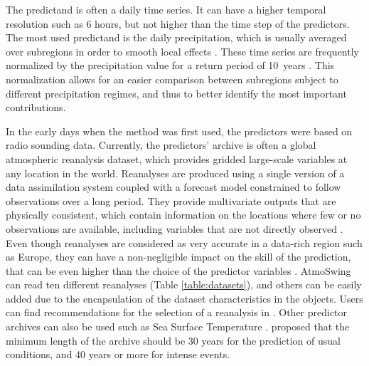 \documentclass[review]{elsarticle}
\begin{document}
The predictand is often a daily time series. It can have a higher temporal resolution such as 6 hours, but not higher than the time step of the predictors. The most used predictand is the daily precipitation, which is usually averaged over subregions in order to smooth local effects \citep{Obled2002, Marty2012}. These time series are frequently normalized by the precipitation value for a return period of 10~years \citep{Djerboua2001}. This normalization allows for an easier comparison between subregions subject to different precipitation regimes, and thus to better identify the most important contributions.

In the early days when the method was first used, the predictors were based on radio sounding data. Currently, the predictors' archive is often a global atmospheric reanalysis dataset, which provides gridded large-scale variables at any location in the world. Reanalyses are produced using a single version of a data assimilation system coupled with a forecast model constrained to follow observations over a long period. They provide multivariate outputs that are physically consistent, which contain information on the locations where few or no observations are available, including variables that are not directly observed \citep{Gelaro2017}. Even though reanalyses are considered as very accurate in a data-rich region such as Europe, they can have a non-negligible impact on the skill of the prediction, that can be even higher than the choice of the predictor variables \cite{Dayon2015, Horton2018b}. AtmoSwing can read ten different reanalyses (Table \ref{table:datasets}), and others can be easily added due to the encapsulation of the dataset characteristics in the objects. Users can find recommendations for the selection of a reanalysis in \cite{Horton2018b}. Other predictor archives can also be used such as Sea Surface Temperature \citep[SST, ][]{Reynolds2007}. \citet{Bontron2004} proposed that the minimum length of the archive should be 30 years for the prediction of usual conditions, and 40 years or more for intense events.
\end{document}
